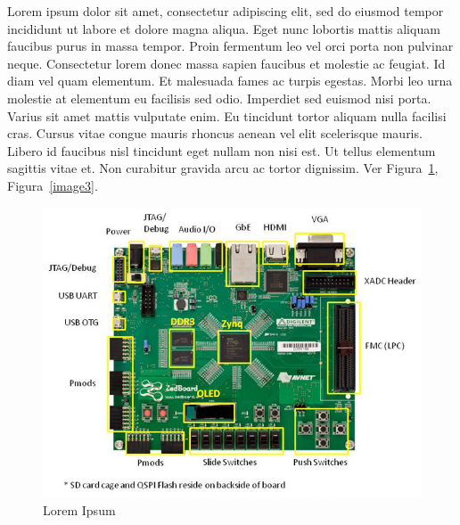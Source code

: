 \documentclass[a4paper,12pt,twoside,openright]{report}
\begin{document}
Lorem ipsum dolor sit amet, consectetur adipiscing elit, sed do eiusmod tempor incididunt ut labore et dolore magna aliqua. Eget nunc lobortis mattis aliquam faucibus purus in massa tempor. Proin fermentum leo vel orci porta non pulvinar neque. Consectetur lorem donec massa sapien faucibus et molestie ac feugiat. Id diam vel quam elementum. Et malesuada fames ac turpis egestas. Morbi leo urna molestie at elementum eu facilisis sed odio. Imperdiet sed euismod nisi porta. Varius sit amet mattis vulputate enim. Eu tincidunt tortor aliquam nulla facilisi cras. Cursus vitae congue mauris rhoncus aenean vel elit scelerisque mauris. Libero id faucibus nisl tincidunt eget nullam non nisi est. Ut tellus elementum sagittis vitae et. Non curabitur gravida arcu ac tortor dignissim. Ver Figura~\ref{image2}, Figura~\ref{image3}.


\begin{figure}[H]
  \centering
    \includegraphics[scale=0.53]{figures/example_image.jpg}
  \caption{Lorem Ipsum}
  \label{image2}
\end{figure}
\end{document}
